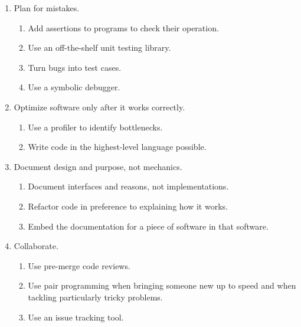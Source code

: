 \documentclass{article}
\begin{document}
{\begin{enumerate}
\item Plan for mistakes.
  \begin{enumerate}
  \item Add assertions to programs to check their operation.
  \item Use an off-the-shelf unit testing library.
  \item Turn bugs into test cases.
  \item Use a symbolic debugger.
  \end{enumerate}

\item Optimize software only after it works correctly.
  \begin{enumerate}
  \item Use a profiler to identify bottlenecks.
  \item Write code in the highest-level language possible.
  \end{enumerate}

\item Document design and purpose, not mechanics.
  \begin{enumerate}
  \item Document interfaces and reasons, not implementations.
  \item Refactor code in preference to explaining how it works.
  \item Embed the documentation for a piece of software in that software.
  \end{enumerate}

\item Collaborate.
  \begin{enumerate}
  \item Use pre-merge code reviews.
  \item Use pair programming when bringing someone new up to speed and when tackling particularly tricky problems.
  \item Use an issue tracking tool.
  \end{enumerate}

\end{enumerate}
}
\end{document}
